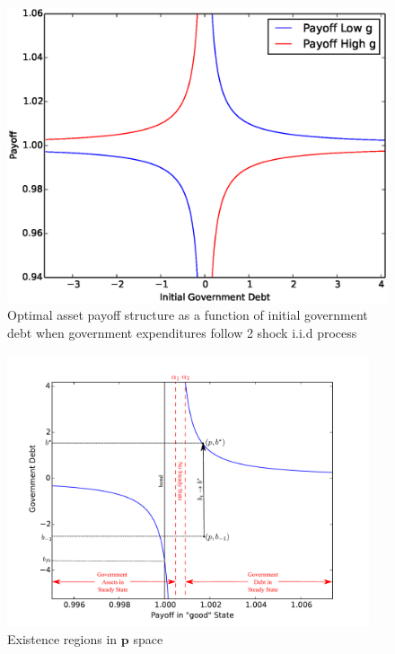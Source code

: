 \documentclass[12pt]{article}
\begin{document}
\begin{enumerate}
\begin{figure}
		\begin{center}
		\includegraphics[scale=.4]{Images/p_graph.eps}
		\caption{Optimal asset payoff structure as a function of initial government debt when government expenditures follow 2 shock i.i.d process}
	\end{center}	
	\end{figure}


\begin{figure}
		\begin{center}
		\includegraphics[width=4.2in]{Images/graph_nostable.pdf}
\caption{Existence regions in $\bm{p}$ space}
	\end{center}	
	\end{figure}




\end{enumerate}
\end{document}
